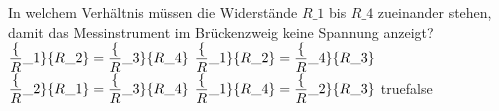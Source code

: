     {In welchem Verhältnis müssen die Widerstände $R\_1$ bis $R\_4$ zueinander stehen, damit das Messinstrument im Brückenzweig keine Spannung anzeigt?}
    {$\dfrac\{R\_1\}\{R\_2\} = \dfrac\{R\_3\}\{R\_4\}$}
    {$\dfrac\{R\_1\}\{R\_2\} = \dfrac\{R\_4\}\{R\_3\}$}
    {$\dfrac\{R\_2\}\{R\_1\} = \dfrac\{R\_3\}\{R\_4\}$}
    {$\dfrac\{R\_1\}\{R\_4\} = \dfrac\{R\_2\}\{R\_3\}$}
    {true}{false}